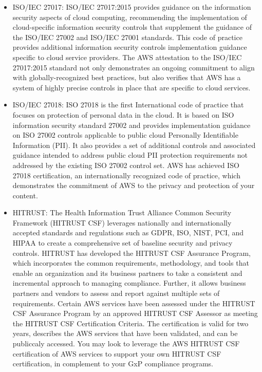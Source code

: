 \begin{itemize}
    \item ISO/IEC 27017: ISO/IEC 27017:2015 provides guidance on the information security aspects of cloud computing, recommending the implementation of cloud-specific information security controls that supplement the guidance of the ISO/IEC 27002 and ISO/IEC 27001 standards. This code of practice provides additional information security controls implementation guidance specific to cloud service providers. The AWS attestation to the ISO/IEC 27017:2015 standard not only demonstrates an ongoing commitment to align with globally-recognized best practices, but also verifies that AWS has a system of highly precise controls in place that are specific to cloud services.
    \item ISO/IEC 27018: ISO 27018 is the first International code of practice that focuses on protection of personal data in the cloud. It is based on ISO information security standard 27002 and provides implementation guidance on ISO 27002 controls applicable to public cloud Personally Identifiable Information (PII). It also provides a set of additional controls and associated guidance intended to address public cloud PII protection requirements not addressed by the existing ISO 27002 control set. AWS has achieved ISO 27018 certification, an internationally recognized code of practice, which demonstrates the commitment of AWS to the privacy and protection of your content.
    \item HITRUST: The Health Information Trust Alliance Common Security Framework (HITRUST CSF) leverages nationally and internationally accepted standards and regulations such as GDPR, ISO, NIST, PCI, and HIPAA to create a comprehensive set of baseline security and privacy controls. HITRUST has developed the HITRUST CSF Assurance Program, which incorporates the common requirements, methodology, and tools that enable an organization and its business partners to take a consistent and incremental approach to managing compliance. Further, it allows business partners and vendors to assess and report against multiple sets of requirements. Certain AWS services have been assessed under the HITRUST CSF Assurance Program by an approved HITRUST CSF Assessor as meeting the HITRUST CSF Certification Criteria. The certification is valid for two years, describes the AWS services that have been validated, and can be publiccaly accessed. You may look to leverage the AWS HITRUST CSF certification of AWS services to support your own HITRUST CSF certification, in complement to your GxP compliance programs.

\end{itemize}
